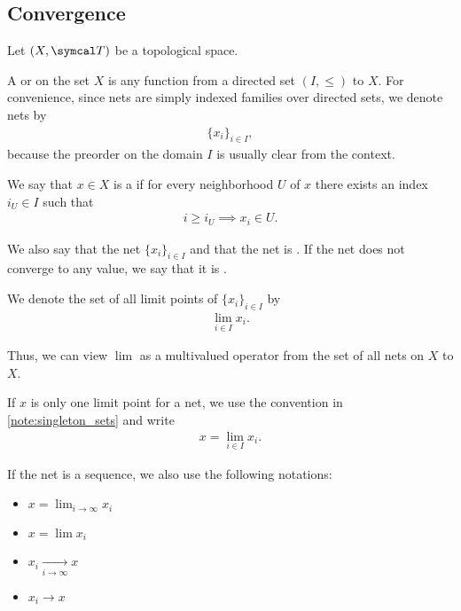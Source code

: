 \subsection{Convergence}\label{sec:convergence}

Let \( (X, \Cal{T}) \) be a topological space.

\begin{definition}\label{def:topological_net}\cite[49]{Engelking1989}
  A  or  on the set \( X \) is any function from a directed set \( (I, \leq) \) to \( X \). For convenience, since nets are simply indexed families over directed sets, we denote nets by
  \begin{align*}
    \{ x_i \}_{i \in I},
  \end{align*}
  because the preorder on the domain \( I \) is usually clear from the context.
\end{definition}

\begin{definition}\label{def:net_limit_point}\cite[49]{Engelking1989}
  We say that \( x \in X \) is a  if for every neighborhood \( U \) of \( x \) there exists an index \( i_U \in I \) such that
  \begin{align*}
    i \geq i_U \implies x_i \in U.
  \end{align*}

  We also say that the net \( \{ x_i \}_{i \in I} \)  and that the net is . If the net does not converge to any value, we say that it is .

  We denote the set of all limit points of \( \{ x_i \}_{i \in I} \) by
  \begin{align*}
    \lim_{i \in I} x_i.
  \end{align*}

  Thus, we can view \( \lim \) as a multivalued operator from the set of all nets on \( X \) to \( X \).

  If \( x \) is only one limit point for a net, we use the convention in \cref{note:singleton_sets} and write
  \begin{align*}
    x = \lim_{i \in I} x_i.
  \end{align*}

  If the net is a sequence, we also use the following notations:
  \begin{itemize}
    \item \( x = \lim_{i \to \infty} x_i \)
    \item \( x = \lim x_i \)
    \item \( x_i \xrightarrow[i \to \infty]{} x \)
    \item \( x_i \to x \)
  \end{itemize}
\end{definition}

